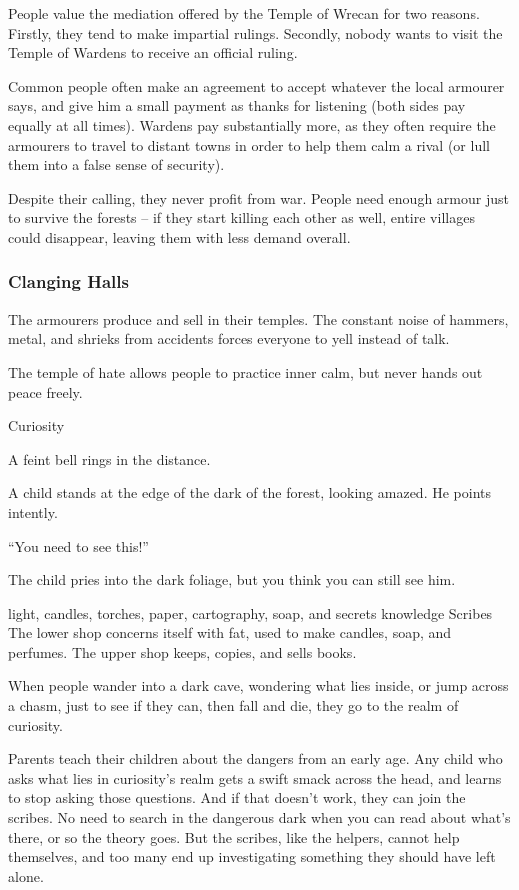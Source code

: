 \begin{multicols}{2}
\noindent
People value the mediation offered by the Temple of Wrecan for two reasons.
Firstly, they tend to make impartial rulings.
Secondly, nobody wants to visit the Temple of Wardens to receive an official ruling.

Common people often make an agreement to accept whatever the local armourer says, and give him a small payment as thanks for listening (both sides pay equally at all times).
Wardens pay substantially more, as they often require the armourers to travel to distant towns in order to help them calm a rival (or lull them into a false sense of security).

Despite their calling, they never profit from war.
People need enough armour just to survive the forests -- if they start killing each other as well, entire villages could disappear, leaving them with less demand overall.

\subsubsection{Clanging Halls}
The armourers produce and sell in their temples.
The constant noise of hammers, metal, and shrieks from accidents forces everyone to yell instead of talk.

The temple of hate allows people to practice inner calm, but never hands out peace freely.

  {Curiosity}%
  {
    A feint bell rings in the distance.

    A child stands at the edge of the dark of the forest, looking amazed.
    He points intently.

    ``You need to see this!''

    The child pries into the dark foliage, but you think you can still see him.
  }%
  {light, candles, torches, paper, cartography, soap, and secrets}%
  {knowledge}%
  {Scribes}%
  {
    The lower shop concerns itself with fat, used to make candles, soap, and perfumes.
    The upper shop keeps, copies, and sells books.
  }%

When people wander into a dark cave, wondering what lies inside, or jump across a chasm, just to see if they can, then fall and die, they go to the realm of curiosity.

Parents teach their children about the dangers from an early age.
Any child who asks what lies in curiosity's realm gets a swift smack across the head, and learns to stop asking those questions.
And if that doesn't work, they can join the scribes.
No need to search in the dangerous dark when you can read about what's there, or so the theory goes.
But the scribes, like the helpers, cannot help themselves, and too many end up investigating something they should have left alone.


\end{multicols}
